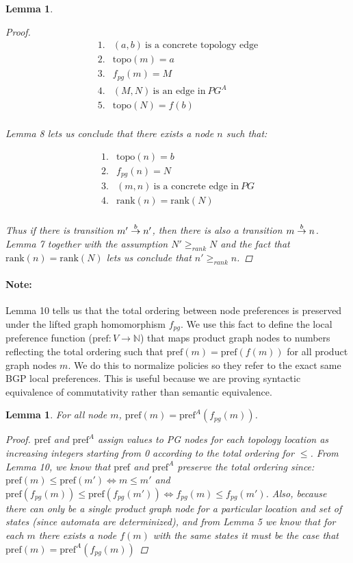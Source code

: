 \documentclass[twocolumn, openany]{sig-alternate-10pt}
\newcommand{\para}[1]{\paragraph*{\textbf{#1}}}
\newcommand{\Pref}{\ensuremath{\mathrm{pref}}}
\newcommand{\Topo}{\ensuremath{\mathrm{topo}}}
\newcommand{\Rank}{\ensuremath{\mathrm{rank}}}
\newtheorem{lem}[thm]{Lemma}
\begin{document}
\begin{lem}
\begin{proof}
    \[ \begin{array}{ll}
      1. & (a,b) ~\text{is a concrete topology edge} \\
      2. & \Topo(m) = a \\
      3. & f_{pg}(m) = M \\
      4. & (M,N) ~\text{is an edge in}~ PG^A \\
      5. & \Topo(N) = f(b) \\
    \end{array} \]

    \noindent
    Lemma 8 lets us conclude that there exists a node $n$ such that:

    \[ \begin{array}{ll}
      1. & \Topo(n) = b \\
      2. & f_{pg}(n) = N \\
      3. & (m,n) ~\text{is a concrete edge in}~ PG \\
      4. & \Rank(n) = \Rank(N) \\
    \end{array} \] 

    \noindent
    Thus if there is transition $\trans{m'}{n'}{b}$, then there is also a transition $\trans{m}{n}{b}$. 
    Lemma 7 together with the assumption $N' \geq_{rank} N$ and the fact that $\Rank(n) = \Rank(N)$ lets us conclude that $n' \geq_{rank} n$.

  \end{proof}

\end{lem}
%
%
\para{Note:}
Lemma 10 tells us that the total ordering between node preferences is preserved under the lifted graph homomorphism $f_{pg}$. 
We use this fact to define the local preference function ($\Pref : V \rightarrow \mathbb{N}$) that maps product graph nodes to numbers reflecting the total ordering such that $\Pref(m) = \Pref(f(m))$ for all product graph nodes $m$. We do this to normalize policies so they refer to the exact same BGP local preferences. This is useful because we are proving syntactic equivalence of commutativity rather than semantic equivalence.
%

\vspace{1em}
\begin{lem}
  For all node $m$, $\Pref(m) = \Pref^A(f_{pg}(m))$.
  \begin{proof}
    $\Pref$ and $\Pref^A$ assign values to PG nodes for each topology location as increasing integers starting from 0 according to the total ordering for $\leq$.
    From Lemma 10, we know that $\Pref$ and $\Pref^A$ preserve the total ordering since: $\Pref(m) \leq \Pref(m') \iff m \leq m'$ and $\Pref(f_{pg}(m)) \leq \Pref(f_{pg}(m')) \iff f_{pg}(m) \leq f_{pg}(m')$. Also, because there can only be a single product graph node for a particular location and set of states (since automata are determinized), and from Lemma 5 we know that for each $m$ there exists a node $f(m)$ with the same states it must be the case that $\Pref(m) = \Pref^A(f_{pg}(m))$
  \end{proof}
\end{lem}
\end{document}

